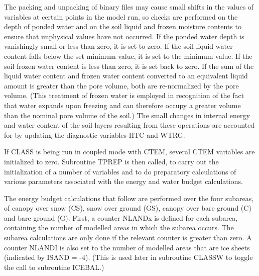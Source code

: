 The packing and unpacking of binary files may cause small shifts in the values of variables at certain points in the model run, so checks are performed on the depth of ponded water and on the soil liquid and frozen moisture contents to ensure that unphysical values have not occurred. If the ponded water depth is vanishingly small or less than zero, it is set to zero. If the soil liquid water content falls below the set minimum value, it is set to the minimum value. If the soil frozen water content is less than zero, it is set back to zero. If the sum of the liquid water content and frozen water content converted to an equivalent liquid amount is greater than the pore volume, both are re-\/normalized by the pore volume. (This treatment of frozen water is employed in recognition of the fact that water expands upon freezing and can therefore occupy a greater volume than the nominal pore volume of the soil.) The small changes in internal energy and water content of the soil layers resulting from these operations are accounted for by updating the diagnostic variables H\+T\+C and W\+T\+R\+G.

If C\+L\+A\+S\+S is being run in coupled mode with C\+T\+E\+M, several C\+T\+E\+M variables are initialized to zero. Subroutine T\+P\+R\+E\+P is then called, to carry out the initialization of a number of variables and to do preparatory calculations of various parameters associated with the energy and water budget calculations.

The energy budget calculations that follow are performed over the four subareas, of canopy over snow (C\+S), snow over ground (G\+S), canopy over bare ground (C) and bare ground (G). First, a counter N\+L\+A\+N\+Dx is defined for each subarea, containing the number of modelled areas in which the subarea occurs. The subarea calculations are only done if the relevant counter is greater than zero. A counter N\+L\+A\+N\+D\+I is also set to the number of modelled areas that are ice sheets (indicated by I\+S\+A\+N\+D = -\/4). (This is used later in subroutine C\+L\+A\+S\+S\+W to toggle the call to subroutine I\+C\+E\+B\+A\+L.)

